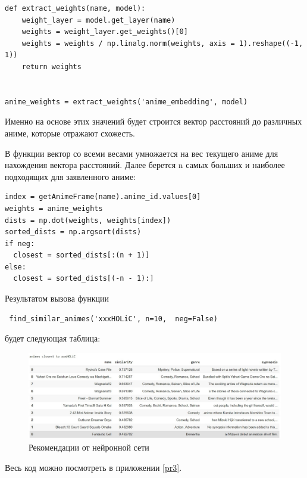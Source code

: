 \documentclass[bachelor, och, diploma]{SCWorks}
\begin{document}
\begin{verbatim}
def extract_weights(name, model):
    weight_layer = model.get_layer(name)
    weights = weight_layer.get_weights()[0]
    weights = weights / np.linalg.norm(weights, axis = 1).reshape((-1, 1))
    return weights


anime_weights = extract_weights('anime_embedding', model)
\end{verbatim}

Именно на основе этих значений будет строится вектор расстояний до различных аниме, которые отражают схожесть.

В функции вектор со всеми весами умножается на вес текущего аниме для нахождения вектора расстояний. Далее берется n самых больших и наиболее подходящих для заявленного аниме:

\begin{verbatim}
index = getAnimeFrame(name).anime_id.values[0]
weights = anime_weights
dists = np.dot(weights, weights[index])
sorted_dists = np.argsort(dists)          
if neg:
  closest = sorted_dists[:(n + 1)]
else:
  closest = sorted_dists[(-n - 1):]
\end{verbatim}

Результатом вызова функции

\begin{verbatim}
 find_similar_animes('xxxHOLiC', n=10,  neg=False)
\end{verbatim}

будет следующая таблица:
\begin{figure}[H]

	\centering
	
	\includegraphics[width=0.8\linewidth]{res1.png}
	
	\caption{Рекомендации от нейронной сети}
	
	\label{fig:r1}
	
\end{figure}

Весь код можно посмотреть в приложении \ref{pr3}.
\end{document}
